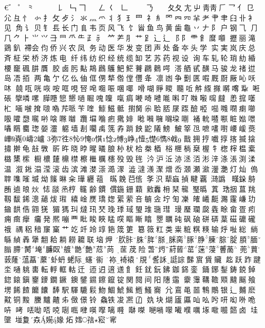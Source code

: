 €゛゜⺀㇀㇁㇂㇃㇄𠄌㇅𠃑𠃍
㇆㇇𠃋𡿨㇈𠃊㇉㇊㇋㇌𠄎㇍㇎
⼡夂𡯁屮⾭靑𠂆乛亻㔾尣彑忄
㣺扌攵歺氵氺灬爫丬犭𤣩罒
礻糹罓𦉪㓁𦍋耂肀𦘒𦥑卝衤见
𧢲讠贝钅镸长门𨸏韦页风飞
饣𩠐鱼鸟黄歯龜丷𠂇阝户钢⺄
⺆⺇⺈⺊⺌⺍⺕⺜⺥⺧⺪⺬
⺮⺶⺼⺾⻊⻌⻍⻏⻖⻗⻞𪎩𡅅
攊丽滝鵎釟𧜵会伨侨兴农凤
务动医华发变团声处备夲头学
实実岚庆总斉柾栄桥济炼电
纤纬纺织经统缆缷艺苏药视设
询车轧轮琑糼緍楆竉碸肼贋
胶𠧧肟黇䳍鷉鸌䰾𩷶𧀎鸊𪄳㗁
溚舾甙䤑马骏龙禇𨑬𡷊𠗐𢫦
两亀亇亿仫伷㑌侽㹈倃㑽㒥夅
凛凼争劐匧㗇厩㕑厰吣㕭㕲
㚁咓咣咴咹哐哯唘唣唨㖘㖥㖿
嗗㗅𧶄䁓𡃴𠰋𧣈𦂥𢵌𡁷𡁯𢆡
𠶖䂻𢳉噒𠼱𦠜𡃏𢠃𢤹㗻𥇣𠺌𠾍
𠺪㾓𠼰𠵇𡅏𠹌𠺫𠮩𠵈𡃀𡄽㿹
𢚖搲𠾭𣏴𠵾𠵿𢱕𠺘𠼮𦭐哌苄喹
𩻃鰦骶𢷮胬尜𦕲脴㞗𨂽醶𠻺
𠸏𠹷𠻻𤷫㘉𠳖嚯𢞵𡃉𠸐𠹸𡁸𡅈
𨈇𡑕𠹹𤹐𢶤婔𡀝𡀞𡃵𡃶垜𠸑
𧚔𨋍𠾵𠹻𥅾㜃𠾶𡆀𥋘𪊽𤧚𡠺𤅷
𨉼墙剨㘚𥜽箲孨䠀䬬鼧䧧鰟
鮍𥭴𣄽嗻㗲嚉崾嵈㷼㠏嶤嶹㠠
弥徃㤈㤿㥍惗愽峥㦉憷懏㦸
戬拥㧸嚱㨃揢揻搇㩋擀龟㪗斆
㪽旿晓㫲暒㬢朖㭂枤㭘桊梄
㭲㭱㭻椉楃牜楤榟榅槖㯝橥橴
橱檂㯬檙㯲檫檵櫔櫶殁毁毪
汵沪㳋洂洆洦涁㳯涤涱渕渘温
溆𨧀溻滢滚齿滨滩漤漴㵆𣽁
澁澾㵪㵵熷岙㶊瀬㶑灐灔灯灿
𠌥䏁㗱𠻘㙎㶭𥱥晽籴璍纒䔃
𤾸𠬍𦬊㑾𢻯𣲵𦺙蝱揁睷覊𣾏譌
𤳉䤪𪀔𨚼𨔁㫰炏𢙺𦦨𤉋梈𢅛
齢鏆𠍿鍦銏蘔𪑛䆐枏栞㡣𤧬㬙
蒖𤥢㧢蒀䍮靱馛䤭漗𧄉炦𤩏
繥崯㷳𤩝𡟟綤萦咅𣫺𠈔坾𠣕𠘙
㿥𡾞𪊶瀃𩅛嵰玏𨩙𩐠俈翧猐
猸獁㺩燵𤣲珡㻊㻑琙琞琟㻢㻰
㻴㻺瓓㼎㽓畭畲疍㽼痈癍癴
㿜発熈嘣覀䀝睃䀹䁅㗛瞘䁪䁯
瞾矋砘砜硇硑硦葈𥔵礳礲䄉
禑稆䅧䆲窼艹䇄竏竛䇏筢筬筻
簒䉠䉺类粜䊌粸䊔输烀𠳏総
緔緐緽羴犟䎗耠耥耮耱联垴炠
肷胩䏭脌脎脒脔䐁㬹腖腙腚
䐓腼䐥䐭膥埯臁臤艔䒏艶苊苘
䒰荗险萅烵葤蒈䔄蒾蓡蓸蔐
蔸蕒䔻蕯蕰藠䕷虲蚒蛯际䘆䘗
袮裿褤覑𧥧訸誔誴豑賔賲贜
䞘跃䟭踺坔嗵䠷軎転軤軭軲迁
迊迌逳䢭飠鈓䤞鈨鉘鉫銱銮
銿鋣鋫鋳鋴鋽鍃鎄鎭䥅䥑鐗鐝
鐭鐾䥪鑔鑹锭関䦧间阳䧥䨤
靀䨵鞲韂䫤颹䬙飱塄餙餷饝饢
䭰駅䮝騼鬏魩鯝鯱鯴䱭鰠㝯
𡯂鵉黾噐鶽鷼银辶麱麽黆铜黢
黱黸齄𠂔𠊷𠎠铃𠓗铁𠗕𠘕𠙶
𡚺块煳𠫂𠫍𠮿吆𠯋咞𠯻𠰻𠱓𠱥
𠱼𠲍𠲵𠳝𠳭𠵯𠶲𠷈𠸄𠸎𠻗𠾐
𠼭𠹳𠾼𡁜𡁏𡁶𡂈𡂖㙇𡂿𡄯𡄻卤
𡋣𡍵𡌶𡕷𡘙𡟃𡟇炻𡠭𡥪𡨭𡩅
